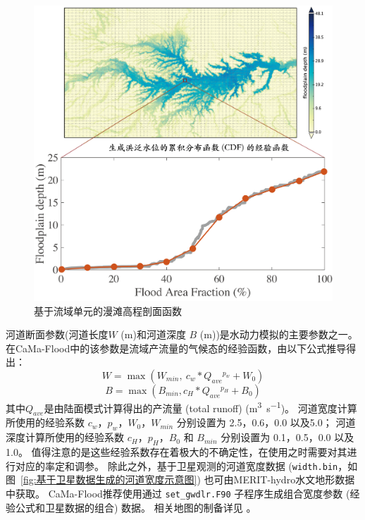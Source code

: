 {
\begin{figure}[htbp]
\centering
\includegraphics[width=1.0\textwidth]{Figures/陆地表面的水分循环/基于流域单元的漫滩高程剖面函数.png}
\caption{基于流域单元的漫滩高程剖面函数}
\label{fig:基于流域单元的漫滩高程剖面函数}
\end{figure}
}


河道断面参数(河道长度$W$ (m)和河道深度 $B$ (m))是水动力模拟的主要参数之一。在CaMa-Flood中的该参数是流域产流量的气候态的经验函数，由以下公式推导得出：
\begin{equation}
W=\max \left(W_{min},\ c_{w} * Q_{ave}{}^{p_{w}}+W_{0}\right)
\end{equation}
\begin{equation}
B=\max \left(B_{min}, c_{H} * Q_{ave}{}^{p_{H}}+B_{0}\right)
\end{equation}
其中$Q_{ave}$是由陆面模式计算得出的产流量 (total runoff) (\unit{m^3.s^{-1}})。
河道宽度计算所使用的经验系数 $c_w$，$p_w$，$W_0$，$W_{min}$ 分别设置为 2.5，0.6，0.0 以及5.0；
河道深度计算所使用的经验系数 $c_H$，$p_H$，$B_0$ 和 $B_{min}$ 分别设置为 0.1，0.5，0.0 以及1.0。
值得注意的是这些经验系数存在着极大的不确定性，在使用之时需要对其进行对应的率定和调参。
除此之外，基于卫星观测的河道宽度数据 (\texttt{width.bin}，如图~\ref{fig:基于卫星数据生成的河道宽度示意图}) 也可由MERIT-hydro水文地形数据中获取。
CaMa-Flood推荐使用通过 \texttt{set\_gwdlr.F90} 子程序生成组合宽度参数 (经验公式和卫星数据的组合) 数据。
相关地图的制备详见 \citet{yamazaki2014regional, yamazaki2014development}。

